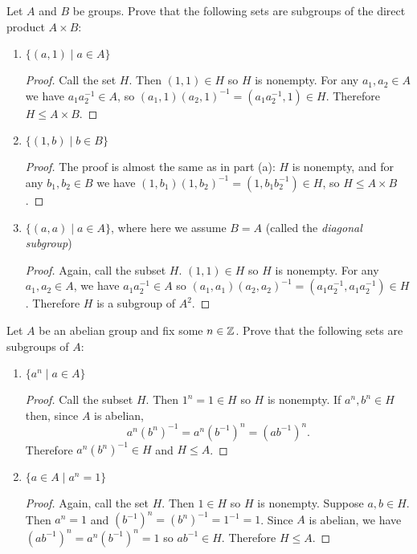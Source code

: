  Let $A$ and $B$ be groups. Prove that the following sets
are subgroups of the direct product $A\times B$:
\begin{enumerate}
\item $\{(a, 1) \mid a\in A\}$
  \begin{proof}
    Call the set $H$. Then $(1,1)\in H$ so $H$ is nonempty. For any
    $a_1,a_2\in A$ we have $a_1a_2^{-1}\in A$, so
    $(a_1,1)(a_2,1)^{-1} = (a_1a_2^{-1}, 1)\in H$. Therefore
    $H\leq A\times B$.
  \end{proof}
\item $\{(1, b) \mid b\in B\}$
  \begin{proof}
    The proof is almost the same as in part (a): $H$ is nonempty, and
    for any $b_1,b_2\in B$ we have
    $(1,b_1)(1,b_2)^{-1} = (1,b_1b_2^{-1})\in H$, so
    $H\leq A\times B$.
  \end{proof}
\item $\{(a, a) \mid a\in A\}$, where here we assume $B = A$ (called
  the {\em diagonal subgroup})
  \begin{proof}
    Again, call the subset $H$. $(1,1)\in H$ so $H$ is nonempty. For
    any $a_1,a_2\in A$, we have $a_1a_2^{-1}\in A$ so
    $(a_1,a_1)(a_2,a_2)^{-1} = (a_1a_2^{-1}, a_1a_2^{-1})\in
    H$. Therefore $H$ is a subgroup of $A^2$.
  \end{proof}
\end{enumerate}

 Let $A$ be an abelian group and fix some $n\in\mathbb{Z}$. Prove
that the following sets are subgroups of $A$:
\begin{enumerate}
\item $\{a^n \mid a\in A\}$
  \begin{proof}
    Call the subset $H$. Then $1^n = 1\in H$ so $H$ is nonempty. If
    $a^n,b^n\in H$ then, since $A$ is abelian,
    \begin{equation*}
      a^n(b^n)^{-1} = a^n(b^{-1})^n = (ab^{-1})^n.
    \end{equation*}
    Therefore $a^n(b^n)^{-1}\in H$ and $H\leq A$.
  \end{proof}
\item $\{a\in A\mid a^n = 1\}$
  \begin{proof}
    Again, call the set $H$. Then $1\in H$ so $H$ is nonempty. Suppose
    $a,b\in H$. Then $a^n = 1$ and
    $(b^{-1})^n = (b^n)^{-1} = 1^{-1} = 1$. Since $A$ is abelian, we
    have $(ab^{-1})^n = a^n(b^{-1})^n = 1$ so $ab^{-1}\in
    H$. Therefore $H\leq A$.
  \end{proof}
\end{enumerate}

